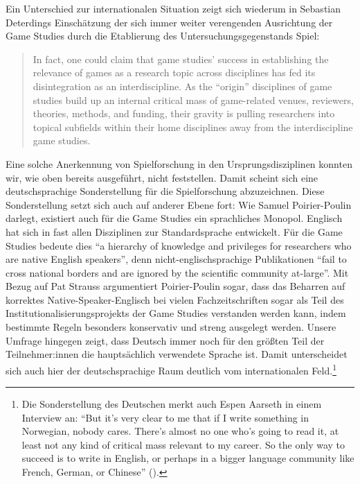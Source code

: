 \documentclass{scrartcl}
\begin{document}
Ein Unterschied zur internationalen Situation zeigt sich wiederum in Sebastian Deterdings Einschätzung der sich immer weiter verengenden Ausrichtung der Game Studies durch die Etablierung des Untersuchungsgegenstands Spiel:

\begin{quote}
   In fact, one could claim that game studies' success in establishing the relevance of games as a research topic across disciplines has fed its disintegration as an interdiscipline.
   As the \enquote{origin} disciplines of game studies build up an internal critical mass of game-related venues, reviewers, theories, methods, and funding, their gravity is pulling researchers into topical subfields within their home disciplines away from the interdiscipline game studies.\autocite[][S.~530]{deterding_pyrrhic_2017}
\end{quote}

Eine solche Anerkennung von Spielforschung in den Ursprungsdisziplinen konnten wir, wie oben bereits ausgeführt, nicht feststellen.
Damit scheint sich eine deutschsprachige Sonderstellung für die Spielforschung abzuzeichnen.
Diese Sonderstellung setzt sich auch auf anderer Ebene fort:
Wie Samuel Poirier-Poulin darlegt, existiert auch für die Game Studies ein sprachliches Monopol.
Englisch hat sich in fast allen Disziplinen zur Standardsprache entwickelt.
Für die Game Studies bedeute dies \enquote{a hierarchy of knowledge and privileges for researchers who are native English speakers}, denn nicht-englischsprachige Publikationen \enquote{fail to cross national borders and are ignored by the scientific community at-large}.\autocite[][S.~676]{poirier-poulin_enquotepublish_2025}
Mit Bezug auf Pat Strauss argumentiert Poirier-Poulin sogar, dass das Beharren auf korrektes Native-Speaker-Englisch bei vielen Fachzeitschriften sogar als Teil des Institutionalisierungsprojekts der Game Studies verstanden werden kann, indem bestimmte Regeln besonders konservativ und streng ausgelegt werden.\autocite[][S.~682]{poirier-poulin_enquotepublish_2025}
Unsere Umfrage hingegen zeigt, dass Deutsch immer noch für den größten Teil der Teilnehmer:innen die hauptsächlich verwendete Sprache ist.
Damit unterscheidet sich auch hier der deutschsprachige Raum deutlich vom internationalen Feld.\footnote{Die Sonderstellung des Deutschen merkt auch Espen Aarseth in einem Interview an: \enquote{But it's very clear to me that if I write something in Norwegian, nobody cares. There's almost no one who's going to read it, at least not any kind of critical mass relevant to my career. So the only way to succeed is to write in English, or perhaps in a bigger language community like French, German, or Chinese} (\autocite[][S.~139]{mejeur_definitions_2025}).}
\end{document}
